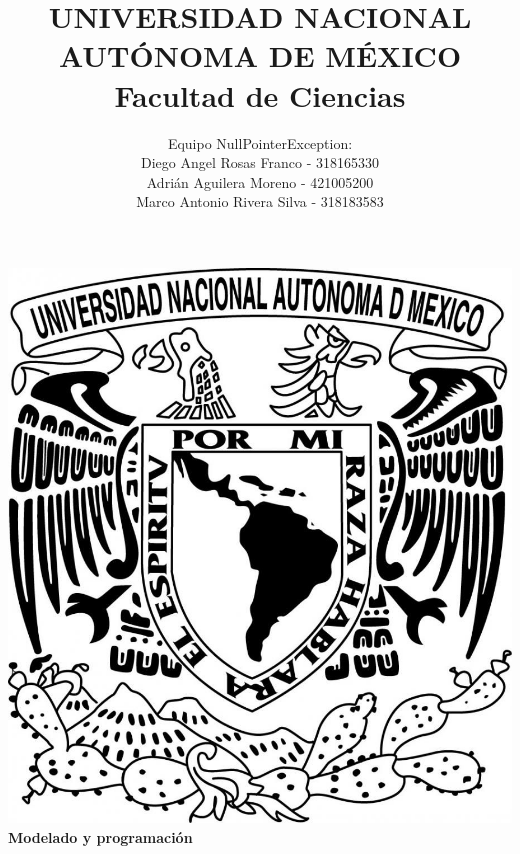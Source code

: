 \title{UNIVERSIDAD NACIONAL AUT\'ONOMA DE M\'EXICO\\ Facultad de Ciencias}
\author{Equipo NullPointerException:\\
  Diego Angel Rosas Franco   - 318165330 \\
  Adri\'an Aguilera Moreno   - 421005200\\
  Marco Antonio Rivera Silva - 318183583}
\date{}
\maketitle
\begin{center}
  \includegraphics[scale=0.20]{../Portada/Portada}\\[0.4cm]
  \Large
  \bf{Modelado y programación}
  \normalsize
\end{center}
\newpage
{}

